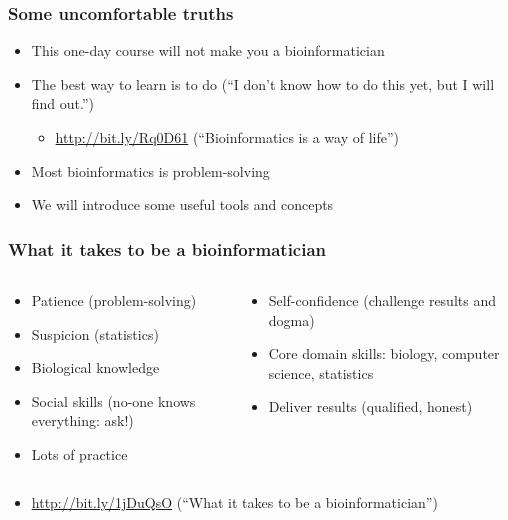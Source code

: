 \documentclass[table]{beamer}
\begin{document}
  \begin{frame}
    \frametitle{Some uncomfortable truths}
    \begin{itemize}
      \item This one-day course will not make you a bioinformatician
      \item The best way to learn is to do (``I don't know how to do this yet, but I will find out.'')
      \begin{itemize}
        \item \url{http://bit.ly/Rq0D61} (``Bioinformatics is a way of life'')
      \end{itemize}
      \item Most bioinformatics is problem-solving
      \item We will introduce some useful tools and concepts
    \end{itemize}
  \end{frame}

  \begin{frame}
    \frametitle{What it takes to be a bioinformatician}
    \begin{columns}[t]
      \begin{column}{5cm}
        \begin{itemize}
          \item Patience (problem-solving)
          \item Suspicion (statistics)
          \item Biological knowledge
          \item Social skills (no-one knows everything: ask!)
	      \item Lots of practice          
	    \end{itemize}
	  \end{column}
	  \begin{column}{5cm}
	    \begin{itemize}
	      \item Self-confidence (challenge results and dogma)
	      \item Core domain skills: biology, computer science, statistics
	      \item Deliver results (qualified, honest)
	    \end{itemize}
	  \end{column}
	\end{columns}
	\begin{itemize}
	  \item \url{http://bit.ly/1jDuQsO} (``What it takes to be a bioinformatician'')
	\end{itemize}
  \end{frame}
\end{document}
